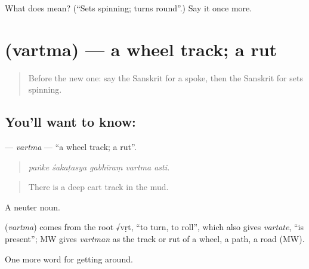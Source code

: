 \begin{tcolorbox}[breakable,colback=teal!4,colframe=teal!35!black,title={Before you move on}]
What does  mean? (\textquotedblleft{}Sets spinning; turns round\textquotedblright{}.) Say it once more.
\end{tcolorbox}
\section[\texorpdfstring{\sk{वर्त्म} (vartma)}{वर्त्म (vartma)}]{ (vartma) — a wheel track; a rut}

\label{lesson:SA-C409-vartma}



\begin{quote}
Before the new one: say the Sanskrit for a spoke, then the Sanskrit for sets spinning.
\end{quote}

\subsection*{You'll want to know: }
\textbf{} — \emph{vartma} — \textquotedblleft{}a wheel track; a rut\textquotedblright{}.

\begin{quote}
    
\end{quote}

\begin{quote}
\emph{paṅke śakaṭasya gabhīraṃ vartma asti.}
\end{quote}

\begin{quote}
There is a deep cart track in the mud.
\end{quote}

A neuter noun.

\begin{cousinweb}
\textbf{} (\emph{vartma}) comes from the root √vṛt, \textquotedblleft{}to turn, to roll\textquotedblright{}, which also gives \emph{vartate}, \textquotedblleft{}is present\textquotedblright{}; MW gives \emph{vartman} as the track or rut of a wheel, a path, a road (MW).
\end{cousinweb}

\begin{grammarlens}[title={What you've built}]
One more word for getting around.
\end{grammarlens}

